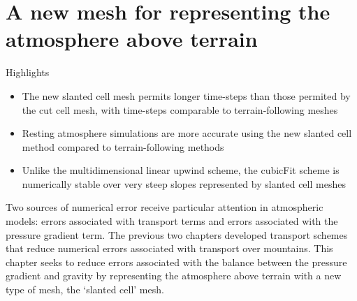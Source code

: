 \chapter{A new mesh for representing the atmosphere above terrain}
\label{ch:slanted}

\begin{highlights}
{\Large Highlights}
\begin{itemize}
	\item The new slanted cell mesh permits longer time-steps than those permited by the cut cell mesh, with time-steps comparable to terrain-following meshes
	\item Resting atmosphere simulations are more accurate using the new slanted cell method compared to terrain-following methods
	\item Unlike the multidimensional linear upwind scheme, the cubicFit scheme is numerically stable over very steep slopes represented by slanted cell meshes
\end{itemize}
\end{highlights}

Two sources of numerical error receive particular attention in atmospheric models: errors associated with transport terms and errors associated with the pressure gradient term.
The previous two chapters developed transport schemes that reduce numerical errors associated with transport over mountains.
This chapter seeks to reduce errors associated with the balance between the pressure gradient and gravity by representing the atmosphere above terrain with a new type of mesh, the `slanted cell' mesh.


